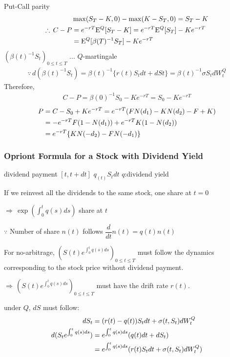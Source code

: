 \documentclass[a4paper,11pt]{jsarticle}
\theoremstyle{definition}
\newcommand{\df}[2]{\dfrac{#1}{#2}}
\begin{document}
Put-Call parity
\begin{align}
  &\max(S_T-K,0)-\max(K-S_T,0)=S_T-K \\
  \therefore\, C-P&=e^{-rT}\mathrm{E}^Q[S_T-K]
  =e^{-rT}\mathrm{E}^Q[S_T]-Ke^{-rT}\notag\\
  &=\mathrm{E}^Q[\beta(T)^{-1}S_T]-Ke^{-rT}
\end{align}
$(\beta(t)^{-1}S_t)_{0\leq t\leq T}$
... $Q$-martingale
\begin{align}
  \because \, d(\beta(t)^{-1}S_t)=\beta(t)^{-1}
  \{r(t)S_tdt+dSt\} =\beta(t)^{-1}\sigma S_tdW_t^Q
\end{align}
Therefore,
\begin{align}
  C-P=\beta(0)^{-1}S_0-Ke^{-rT}=S_0-Ke^{-rT}
\end{align}
\begin{align}
  P&=C-S_0+Ke^{-rT}
  =e^{-rT}(FN(d_1)-KN(d_2)-F+K)\notag\\
  &=-e^{-rT}F(1-N(d_1))+e^{-rT}K(1-N(d_2))\notag\\
  &=e^{-rT}\{KN(-d_2)-FN(-d_1)\}
\end{align}


\subsubsection{Opriont Formula for a Stock with Dividend Yield}

dividend payment $[t,t+dt]$ $q_(t)S_t dt$
$q$:dividend yield

If we reinvest all the dividends to the same stock,
one share at $t=0$

$\Rightarrow \, \exp\left(\int_0^t q(s)ds \right)$ share at $t$

$\because$ Number of share $n(t)$ follows
$\df{d}{dt}n(t)=q(t)n(t)$


For no-arbitrage,
$\left(S(t)e^{\int_0^t q(s)ds}\right)_{0\leq t\leq T}$
must follow the dynamics corresponding to the stock price
without dividend payment.

$\Rightarrow \, \left(S(t)e^{\int_0^t q(s)ds}\right)_{0\leq t\leq T}$
must have the drift rate $r(t)$.

under $Q$, $dS$ must follow:
\begin{align}
  dS_t&=(r(t)-q(t))S_t dt+\sigma(t,S_t)dW_t^Q \\
  d(S_t e^{\int_0^t q(s)ds})
  &=e^{\int_0^t q(s)ds}(q(t)dt+dS_t) \notag \\
  &=e^{\int_0^t q(s)ds}(r(t)S_t dt+\sigma(t,S_t)dW_t^Q)
\end{align}
\end{document}
